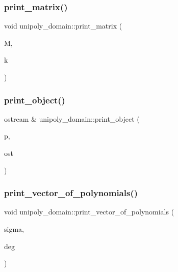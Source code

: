 \mbox{\label{classunipoly__domain_a1545a0aa8f528e9ad2246e4bd8784e63}} 
\subsubsection{\texorpdfstring{print\+\_\+matrix()}{print\_matrix()}}
{\footnotesize\ttfamily void unipoly\+\_\+domain\+::print\+\_\+matrix (\begin{DoxyParamCaption}\item[{\mbox{\hyperlink{galois_8h_a77ca58de3d2da6172242493dd9c8aaa8}{unipoly\+\_\+object}} $\ast$}]{M,  }\item[{\mbox{\hyperlink{galois_8h_a09fddde158a3a20bd2dcadb609de11dc}{I\+NT}}}]{k }\end{DoxyParamCaption})}

\mbox{\label{classunipoly__domain_ad73fd87ed54b67e1091ece74f80ff6d7}} 
\subsubsection{\texorpdfstring{print\+\_\+object()}{print\_object()}}
{\footnotesize\ttfamily ostream \& unipoly\+\_\+domain\+::print\+\_\+object (\begin{DoxyParamCaption}\item[{\mbox{\hyperlink{galois_8h_a77ca58de3d2da6172242493dd9c8aaa8}{unipoly\+\_\+object}}}]{p,  }\item[{ostream \&}]{ost }\end{DoxyParamCaption})}

\mbox{\label{classunipoly__domain_a0648a345dd2f83f6e3978feab88d5461}} 
\subsubsection{\texorpdfstring{print\+\_\+vector\+\_\+of\+\_\+polynomials()}{print\_vector\_of\_polynomials()}}
{\footnotesize\ttfamily void unipoly\+\_\+domain\+::print\+\_\+vector\+\_\+of\+\_\+polynomials (\begin{DoxyParamCaption}\item[{\mbox{\hyperlink{galois_8h_a77ca58de3d2da6172242493dd9c8aaa8}{unipoly\+\_\+object}} $\ast$}]{sigma,  }\item[{\mbox{\hyperlink{galois_8h_a09fddde158a3a20bd2dcadb609de11dc}{I\+NT}}}]{deg }\end{DoxyParamCaption})}

